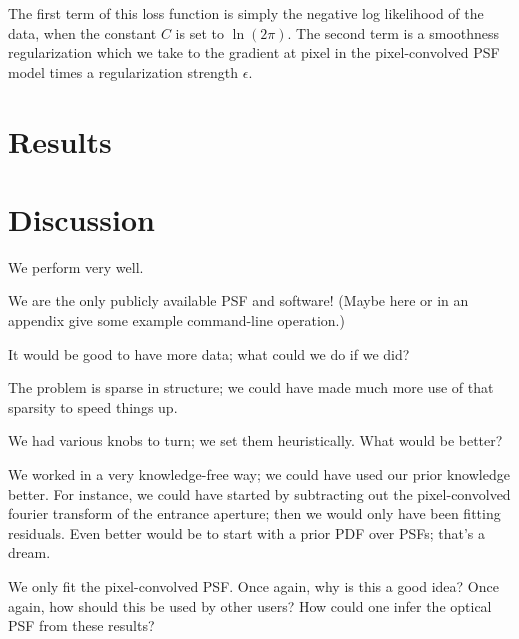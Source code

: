 \documentclass[12pt,letterpaper,preprint]{aastex}
\begin{document}
\noindent The first term of this loss function is simply the negative log likelihood of the data, 
when the constant $C$ is set to $\ln(2\pi)$.  The second term is a smoothness regularization which 
we take to the gradient at pixel in the pixel-convolved PSF model times a regularization 
strength $\epsilon$.

\section{Results}

\section{Discussion}

We perform very well.

We are the only publicly available PSF and software!
(Maybe here or in an appendix give some example command-line operation.)

It would be good to have more data;
  what could we do if we did?

The problem is sparse in structure;
  we could have made much more use of that sparsity to speed things up.

We had various knobs to turn; we set them heuristically.
What would be better?

We worked in a very knowledge-free way;
  we could have used our prior knowledge better.
For instance, we could have started by subtracting out the pixel-convolved fourier transform of the entrance aperture;
  then we would only have been fitting residuals.
Even better would be to start with a prior PDF over PSFs;
  that's a dream.

We only fit the pixel-convolved PSF.
Once again, why is this a good idea?
Once again, how should this be used by other users?
How could one infer the optical PSF from these results?
\end{document}
